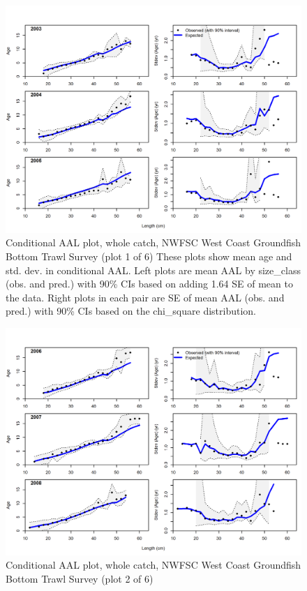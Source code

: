 \documentclass[12pt,]{article}
\begin{document}
\begin{figure}
\centering
\includegraphics{r4ss/plots_mod1/comp_condAALfit_Andre_plotsflt7mkt0_page1.png}
\caption{Conditional AAL plot, whole catch, NWFSC West Coast Groundfish
Bottom Trawl Survey (plot 1 of 6) These plots show mean age and std.
dev. in conditional AAL. Left plots are mean AAL by size\_class (obs.
and pred.) with 90\% CIs based on adding 1.64 SE of mean to the data.
Right plots in each pair are SE of mean AAL (obs. and pred.) with 90\%
CIs based on the chi\_square distribution.
\label{fig:nwfsc_combo_andre_1}}
\end{figure}

\begin{figure}
\centering
\includegraphics{r4ss/plots_mod1/comp_condAALfit_Andre_plotsflt7mkt0_page2.png}
\caption{Conditional AAL plot, whole catch, NWFSC West Coast Groundfish
Bottom Trawl Survey (plot 2 of 6) \label{fig:nwfsc_combo_andre_2}}
\end{figure}
\end{document}
